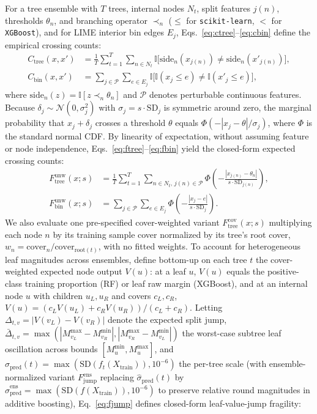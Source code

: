 \documentclass[conference]{IEEEtran}
\begin{document}
For a tree ensemble with $T$ trees, internal nodes $N_t$, split features $j(n)$, thresholds $\theta_n$, and branching operator $\prec_n$ ($\le$ for \texttt{scikit-learn}, $<$ for \texttt{XGBoost}), and for LIME interior bin edges $E_j$, Eqs.~\eqref{eq:ctree}--\eqref{eq:cbin} define the empirical crossing counts:
\begin{align}
C_{\mathrm{tree}}(x, x') &= \frac{1}{T}\sum_{t=1}^T \sum_{n \in N_t} \mathbb{I}\big[\mathrm{side}_n(x_{j(n)}) \neq \mathrm{side}_n(x'_{j(n)})\big], \label{eq:ctree} \\
C_{\mathrm{bin}}(x, x') &= \sum_{j \in \mathcal{P}} \sum_{e \in E_j} \mathbb{I}\big[\mathbb{I}(x_j \le e) \neq \mathbb{I}(x'_j \le e)\big], \label{eq:cbin}
\end{align}
where $\mathrm{side}_n(z) = \mathbb{I}[z \prec_n \theta_n]$ and $\mathcal{P}$ denotes perturbable continuous features. Because $\delta_j \sim \mathcal{N}(0, \sigma_j^2)$ with $\sigma_j = s\cdot\mathrm{SD}_j$ is symmetric around zero, the marginal probability that $x_j + \delta_j$ crosses a threshold $\theta$ equals $\Phi(-|x_j - \theta|/\sigma_j)$, where $\Phi$ is the standard normal CDF. By linearity of expectation, without assuming feature or node independence, Eqs.~\eqref{eq:ftree}--\eqref{eq:fbin} yield the closed-form expected crossing counts:
\begin{align}
F_{\mathrm{tree}}^{\mathrm{unw}}(x; s) &= \frac{1}{T}\sum_{t=1}^T \sum_{n \in N_t,\, j(n)\in\mathcal{P}} \Phi\!\left(-\frac{|x_{j(n)} - \theta_n|}{s\cdot\mathrm{SD}_{j(n)}}\right), \label{eq:ftree} \\
F_{\mathrm{bin}}^{\mathrm{unw}}(x; s) &= \sum_{j \in \mathcal{P}} \sum_{e \in E_j} \Phi\!\left(-\frac{|x_j - e|}{s\cdot\mathrm{SD}_j}\right). \label{eq:fbin}
\end{align}
We also evaluate one pre-specified cover-weighted variant $F_{\mathrm{tree}}^{\mathrm{cov}}(x; s)$ multiplying each node $n$ by its training sample cover normalized by its tree's root cover, $w_n = \mathrm{cover}_n / \mathrm{cover}_{\mathrm{root}(t)}$, with no fitted weights. To account for heterogeneous leaf magnitudes across ensembles, define bottom-up on each tree $t$ the cover-weighted expected node output $V(u)$: at a leaf $u$, $V(u)$ equals the positive-class training proportion (RF) or leaf raw margin (XGBoost), and at an internal node $u$ with children $u_L, u_R$ and covers $c_L, c_R$, $V(u) = (c_L V(u_L) + c_R V(u_R))/(c_L + c_R)$. Letting $\Delta_{t,v} = |V(v_L) - V(v_R)|$ denote the expected split jump, $\bar{\Delta}_{t,v} = \max(|M_{v_L}^{\max}-M_{v_R}^{\min}|, |M_{v_R}^{\max}-M_{v_L}^{\min}|)$ the worst-case subtree leaf oscillation across bounds $[M_u^{\min}, M_u^{\max}]$, and $\hat{\sigma}_{\mathrm{pred}}(t) = \max(\mathrm{SD}(f_t(X_{\mathrm{train}})), 10^{-6})$ the per-tree scale (with ensemble-normalized variant $F_{\mathrm{jump}}^{\mathrm{ens}}$ replacing $\hat{\sigma}_{\mathrm{pred}}(t)$ by $\hat{\sigma}_{\mathrm{pred}}^{\mathrm{ens}} = \max(\mathrm{SD}(f(X_{\mathrm{train}})), 10^{-6})$ to preserve relative round magnitudes in additive boosting), Eq.~\eqref{eq:fjump} defines closed-form leaf-value-jump fragility:
\end{document}
